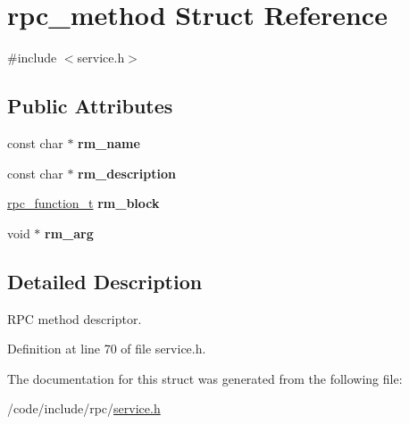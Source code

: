 \hypertarget{structrpc__method}{}\section{rpc\+\_\+method Struct Reference}
\label{structrpc__method}


{\ttfamily \#include $<$service.\+h$>$}

\subsection*{Public Attributes}
\begin{DoxyCompactItemize}
\item 
const char $\ast$ {\bfseries rm\+\_\+name}\hypertarget{structrpc__method_abeff7db58d8903e9e6827d4acac7a8a0}{}\label{structrpc__method_abeff7db58d8903e9e6827d4acac7a8a0}

\item 
const char $\ast$ {\bfseries rm\+\_\+description}\hypertarget{structrpc__method_ab384c866584326d2e06c04ce1972a65a}{}\label{structrpc__method_ab384c866584326d2e06c04ce1972a65a}

\item 
\hyperlink{service_8h_a02d3dbd723de9bd5140887c9935ff05a}{rpc\+\_\+function\+\_\+t} {\bfseries rm\+\_\+block}\hypertarget{structrpc__method_ad6f2db7ebb8d4747730d4cb25b0c6824}{}\label{structrpc__method_ad6f2db7ebb8d4747730d4cb25b0c6824}

\item 
void $\ast$ {\bfseries rm\+\_\+arg}\hypertarget{structrpc__method_afc4708084618f0879e54efda3292cf8c}{}\label{structrpc__method_afc4708084618f0879e54efda3292cf8c}

\end{DoxyCompactItemize}


\subsection{Detailed Description}
R\+PC method descriptor. 

Definition at line 70 of file service.\+h.



The documentation for this struct was generated from the following file\+:\begin{DoxyCompactItemize}
\item 
/code/include/rpc/\hyperlink{service_8h}{service.\+h}\end{DoxyCompactItemize}
